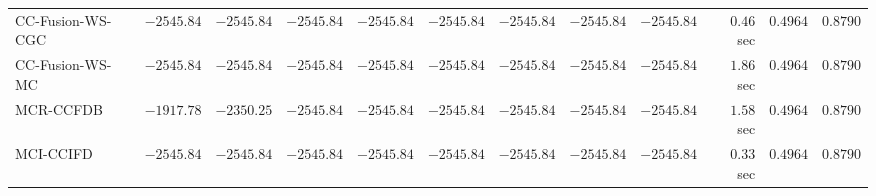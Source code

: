\begin{table}[H]
\begin{tabular}{lrrrrrrrrrrr}
    CC-Fusion-WS-CGC & $     -2545.84$ & $     -2545.84$ & $     -2545.84$ & $     -2545.84$ & $     -2545.84$ & $     -2545.84$ & $     -2545.84$ & $     -2545.84$ & $         0.46$ sec    & $       0.4964$  & $       0.8790$ \\ 
     CC-Fusion-WS-MC & $     -2545.84$ & $     -2545.84$ & $     -2545.84$ & $     -2545.84$ & $     -2545.84$ & $     -2545.84$ & $     -2545.84$ & $     -2545.84$ & $         1.86$ sec    & $       0.4964$  & $       0.8790$ \\ 
\cmidrule{1-1} 
           MCR-CCFDB & $     -1917.78$ & $     -2350.25$ & $     -2545.84$ & $     -2545.84$ & $     -2545.84$ & $     -2545.84$ & $     -2545.84$ & $     -2545.84$ & $         1.58$ sec    & $       0.4964$  & $       0.8790$ \\ 
\cmidrule{1-1} 
           MCI-CCIFD & $     -2545.84$ & $     -2545.84$ & $     -2545.84$ & $     -2545.84$ & $     -2545.84$ & $     -2545.84$ & $     -2545.84$ & $     -2545.84$ & $         0.33$ sec    & $       0.4964$  & $       0.8790$ \\ 
\bottomrule
\end{tabular}
\end{table}

